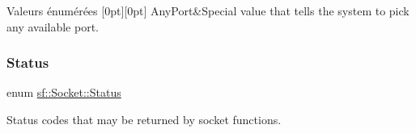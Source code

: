 \begin{DoxyEnumFields}{Valeurs énumérées}
[0pt][0pt]{}\mbox{\label{classsf_1_1Socket_a5deb2c955fd347259c3a20d27b2481aaa5a3c30fd128895403afc11076f461b19}} 
Any\+Port&Special value that tells the system to pick any available port. \\
\hline

\end{DoxyEnumFields}
\mbox{\label{classsf_1_1Socket_a51bf0fd51057b98a10fbb866246176dc}} 
\subsubsection{\texorpdfstring{Status}{Status}}
{\footnotesize\ttfamily enum \hyperlink{classsf_1_1Socket_a51bf0fd51057b98a10fbb866246176dc}{sf\+::\+Socket\+::\+Status}}



Status codes that may be returned by socket functions. 

